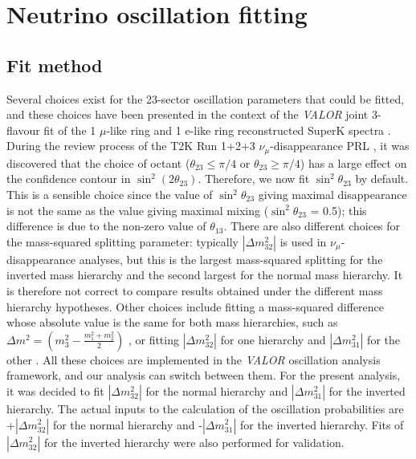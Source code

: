 \clearpage

\section {Neutrino oscillation fitting}
\label{sec:oscfit}

\subsection {Fit method}
\label{sec:oscfit_method}

Several choices exist for the 23-sector oscillation parameters that could be fitted, 
and these choices have been presented in the context of the {\em VALOR} joint 3-flavour fit of the 1 $\mu$-like ring 
and 1 e-like ring reconstructed SuperK spectra \cite{Lorena}.
During the review process of the T2K Run 1+2+3 $\nu_{\mu}$-disappearance PRL \cite{T2KRun123Disapp}, it was discovered that the
choice of octant ($\theta_{23} \leq \pi/4$ or $\theta_{23} \geq \pi/4$) has a large effect on the confidence contour in $\sin^2(2\theta_{23})$.
Therefore, we now fit $\sin^2\theta_{23}$ by default. This is a sensible choice since the value of $\sin^2\theta_{23}$ giving
 maximal disappearance is not the same as the value giving maximal mixing ($\sin^2\theta_{23}$ = 0.5); this difference is 
due to the non-zero value of $\theta_{13}$.
There are also different choices for the mass-squared splitting parameter: typically $|\Delta m^{2}_{32}|$ is used in $\nu_{\mu}$-disappearance 
analyses, but this is the largest mass-squared splitting for the inverted mass
hierarchy and the second largest for the normal mass hierarchy. 
It is therefore not correct to compare results obtained under the different mass hierarchy hypotheses.
Other choices include fitting a mass-squared difference whose absolute value is the same for both mass hierarchies,
such as $\Delta m^{2} = \left(m_{3}^{2} - \frac {m_{1}^{2}+m_{2}^{2}} {2} \right)$ \cite{FogliLisi},
or fitting $|\Delta m^{2}_{32}|$ for one hierarchy and $|\Delta m^{2}_{31}|$ for the other \cite{GonzalezGarcia}.
All these choices are implemented in the {\em VALOR} oscillation analysis framework, and our analysis can switch between them.
For the present analysis, it was decided to fit 
$|\Delta m^{2}_{32}|$ for the normal hierarchy and $|\Delta m^{2}_{31}|$ for the inverted hierarchy. The actual inputs to the calculation 
of the oscillation probabilities are +$|\Delta m^{2}_{32}|$ for the normal hierarchy and -$|\Delta m^{2}_{31}|$ for the inverted hierarchy.
Fits of $|\Delta m^{2}_{32}|$ for the inverted hierarchy were also performed for validation.

